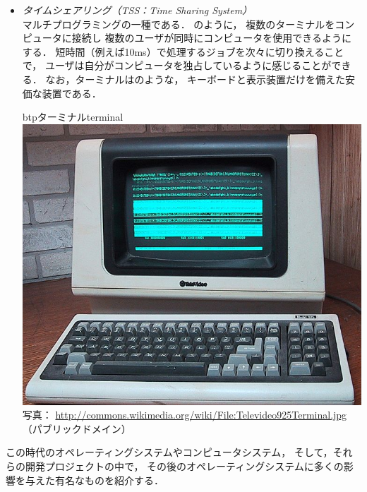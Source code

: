 \begin{itemize}
\begin{figure}[btp]
\begin{center}
\begin{minipage}{0.49\columnwidth}
      \end{minipage}
    \end{center}
  \end{figure}
\item \emph{タイムシェアリング（TSS：Time Sharing System）} \\
  マルチプログラミングの一種である．
  のように，
  複数のターミナルをコンピュータに接続し
  複数のユーザが同時にコンピュータを使用できるようにする．
  短時間（例えば10ms）で処理するジョブを次々に切り換えることで，
  ユーザは自分がコンピュータを独占しているように感じることができる．
  なお，ターミナルはのような，
  キーボードと表示装置だけを備えた安価な装置である．
  \begin{myfig}{btp}{ターミナル}{terminal}
    \includegraphics[scale=0.25]
     {Photo/724px-Televideo925Terminal.jpeg}\\
     {\small 写真：
       \url{http://commons.wikimedia.org/wiki/File:Televideo925Terminal.jpg}
       （パブリックドメイン）}
  \end{myfig}
\end{itemize}

この時代のオペレーティングシステムやコンピュータシステム，
そして，それらの開発プロジェクトの中で，
その後のオペレーティングシステムに多くの影響を与えた有名なものを紹介する．

